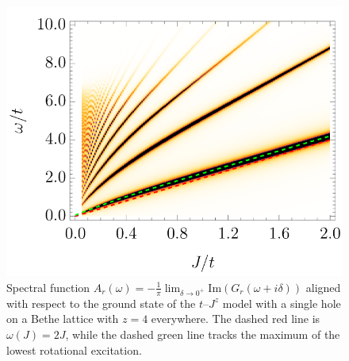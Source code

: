 \documentclass[10pt, a4paper, onecolumn]{article}
\begin{document}
\begin{figure}[h!]
	\includegraphics[width=0.73\columnwidth]
	{./figures/linear.png}
	\caption{
		Spectral function $A_r(\omega) = -\frac{1}{\pi}\lim_{\delta \to 0^+}\mathrm{Im}(G_r(\omega + i\delta))$ aligned with respect to the ground state of the $t$--$J^z$ model with a single hole on a Bethe lattice with $z = 4$ everywhere. The dashed red line is $\omega(J) = 2J$, while the dashed green line tracks the maximum of the lowest rotational excitation.
	}\label{fig:linear}
\end{figure}
\end{document}
